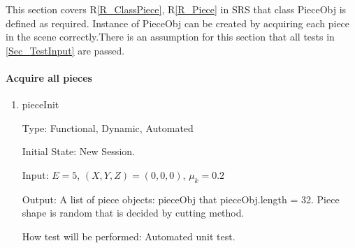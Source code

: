 \documentclass[12pt, titlepage]{article}
\newcommand{\rref}[1]{R\ref{#1}}
\begin{document}
	This section covers \rref{R_ClassPiece}, \rref{R_Piece} in SRS that class PieceObj is defined as required. Instance of PieceObj can be created by acquiring each piece in the scene correctly.There is an assumption for this section that all tests in \ref{Sec_TestInput} are passed.
	
	\paragraph{Acquire all pieces}
	\begin{enumerate}
		
		\item{pieceInit}
		
		Type: Functional, Dynamic, Automated
		
		Initial State: New Session.
		
		Input: $E = 5$, $(X,Y,Z) = (0,0,0)$, $\mu_{k} = 0.2$  
		
		Output: A list of piece objects: pieceObj that pieceObj.length = 32. Piece shape is random that is decided by cutting method.
		
		How test will be performed: Automated unit test.	
	
	
	\end{enumerate}
	
\end{document}
